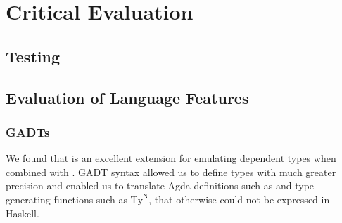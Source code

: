 \chapter{Critical Evaluation}
\label{chap:evaluation}

% 
% 

\section{Testing}

\section{Evaluation of Language Features}

\subsection{GADTs}

We found that  is an excellent extension for emulating dependent types when combined with . GADT syntax allowed us to define types  with much greater precision and enabled us to translate Agda  definitions such as  and type generating functions such as $\text{Ty}^\text{N}$, that otherwise could not be expressed in Haskell.

